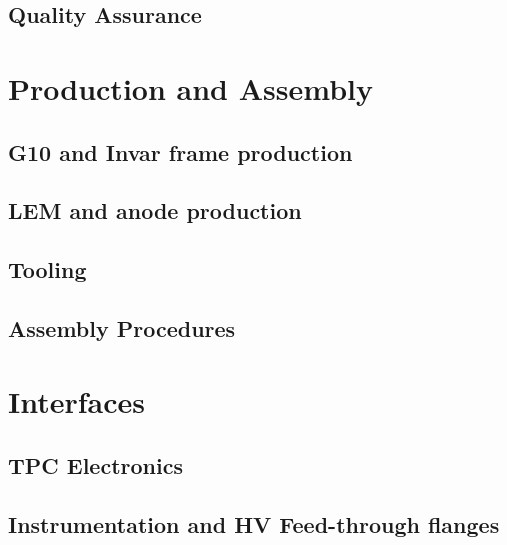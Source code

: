 \subsection{Quality Assurance}
\label{sec:fddp-crp-qa}

\section{Production and Assembly}
\label{sec:fddp-crp-prod-assy}

\subsection{G10 and Invar frame production}
\label{sec:fddp-crp-frame}

\subsection{LEM and anode production}
\label{sec:fddp-crp-LASprod}

\subsection{Tooling}
\label{sec:fddp-crp-tooling}


\subsection{Assembly Procedures}
\label{sec:fddp-crp-assy}


\section{Interfaces}
\label{sec:fddp-crp-intfc}


\subsection{TPC Electronics}
\label{sec:fddp-crp-intfc-elec}


\subsection{Instrumentation and HV Feed-through flanges}
\label{sec:fddp-crp-intfc-FT}

